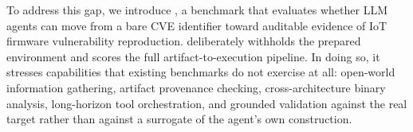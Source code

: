 To address this gap, we introduce \sys, a benchmark that evaluates whether LLM agents can move from a bare CVE identifier toward auditable evidence of IoT firmware vulnerability reproduction.
%
\sys{} deliberately withholds the prepared environment and scores the full artifact-to-execution pipeline. 
%
In doing so, it stresses capabilities that existing benchmarks do not exercise at all: open-world information gathering, artifact provenance checking, cross-architecture binary analysis, long-horizon tool orchestration, and grounded validation against the real target rather than against a surrogate of the agent's own construction.



